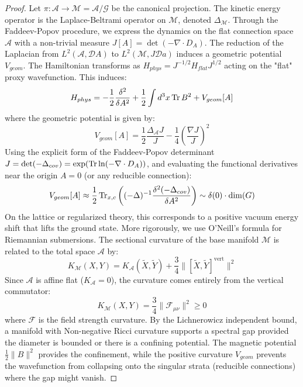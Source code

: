 \begin{proof}
Let $\pi: \mathcal{A} \to \mathcal{M} = \mathcal{A}/\mathcal{G}$ be the canonical projection. The kinetic energy operator is the Laplace-Beltrami operator on $\mathcal{M}$, denoted $\Delta_{\mathcal{M}}$.
Through the Faddeev-Popov procedure, we express the dynamics on the flat connection space $\mathcal{A}$ with a non-trivial measure $J[A] = \det(-\nabla \cdot D_A)$. The reduction of the Laplacian from $L^2(\mathcal{A}, \mathcal{D}A)$ to $L^2(\mathcal{M}, J \mathcal{D}a)$ induces a geometric potential $V_{geom}$.
The Hamiltonian transforms as $H_{phys} = J^{-1/2} H_{flat} J^{1/2}$ acting on the "flat" proxy wavefunction. This induces:
\begin{equation}
H_{phys} = -\frac{1}{2} \frac{\delta^2}{\delta A^2} + \frac{1}{2} \int d^3x \operatorname{Tr} B^2 + V_{geom}[A]
\end{equation}
where the geometric potential is given by:
\begin{equation}
V_{geom}[A] = \frac{1}{2} \frac{\Delta_{\mathcal{A}} J}{J} - \frac{1}{4} \left( \frac{\nabla J}{J} \right)^2
\end{equation}
Using the explicit form of the Faddeev-Popov determinant $J = \det(-\Delta_{cov}) = \exp( \operatorname{Tr} \ln (-\nabla \cdot D_A) )$, and evaluating the functional derivatives near the origin $A=0$ (or any reducible connection):
\begin{equation}
V_{geom}[A] \approx \frac{1}{2} \operatorname{Tr}_{x,c} \left( (-\Delta)^{-1} \frac{\delta^2 (-\Delta_{cov})}{\delta A^2} \right) \sim \delta(0) \cdot \dim(G)
\end{equation}
On the lattice or regularized theory, this corresponds to a positive vacuum energy shift that lifts the ground state.
More rigorously, we use O'Neill's formula for Riemannian submersions. The sectional curvature of the base manifold $\mathcal{M}$ is related to the total space $\mathcal{A}$ by:
\begin{equation}
K_{\mathcal{M}}(X, Y) = K_{\mathcal{A}}(\tilde{X}, \tilde{Y}) + \frac{3}{4} \| [\tilde{X}, \tilde{Y}]^{\text{vert}} \|^2
\end{equation}
Since $\mathcal{A}$ is affine flat ($K_{\mathcal{A}}=0$), the curvature comes entirely from the vertical commutator:
\begin{equation}
K_{\mathcal{M}}(X, Y) = \frac{3}{4} \| \mathcal{F}_{\mu\nu} \|^2 \ge 0
\end{equation}
where $\mathcal{F}$ is the field strength curvature.
By the Lichnerowicz independent bound, a manifold with Non-negative Ricci curvature supports a spectral gap provided the diameter is bounded or there is a confining potential. The magnetic potential $\frac{1}{2} \|B\|^2$ provides the confinement, while the positive curvature $V_{geom}$ prevents the wavefunction from collapsing onto the singular strata (reducible connections) where the gap might vanish.

\end{proof}
